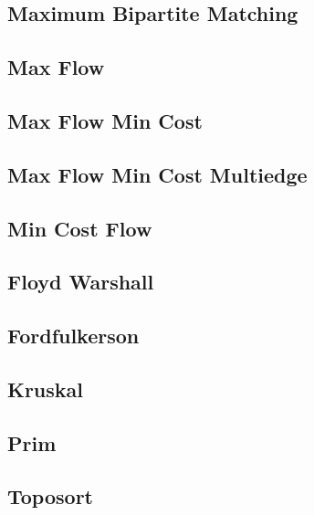 \documentclass[10pt,landscape,twocolumn,a4paper,notitlepage]{article}
\newcommand\cppfile[2][]{

}
\begin{document}
\subsection{Maximum Bipartite Matching}
\cppfile{grafos/flow/maximum_bipartite_matching.cpp}

\subsection{Max Flow}
\cppfile{grafos/flow/max_flow.cpp}

\subsection{Max Flow Min Cost}
\cppfile{grafos/flow/max_flow_min_cost.cpp}

\subsection{Max Flow Min Cost Multiedge}
\cppfile{grafos/flow/max_flow_min_cost_multiedge.cpp}

\subsection{Min Cost Flow}
\cppfile{grafos/flow/min_cost_flow.cpp}

\newpage

\subsection{Floyd Warshall}
\cppfile{grafos/floyd_warshall.cpp}

\subsection{Fordfulkerson}
\cppfile{grafos/FordFulkerson.cpp}

\subsection{Kruskal}
\cppfile{grafos/kruskal.cpp}

\subsection{Prim}
\cppfile{grafos/prim.cpp}

\subsection{Toposort}
\cppfile{grafos/toposort.cpp}
\end{document}
